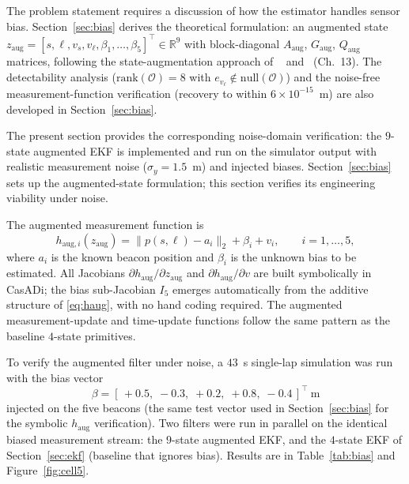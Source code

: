 \documentclass[11pt,a4paper]{article}
\begin{document}
The problem statement requires a discussion of how the estimator
handles sensor bias. Section~\ref{sec:bias} derives the theoretical
formulation: an augmented state
$z_\text{aug}=[s,\ell,v_s,v_\ell,\beta_1,\dots,\beta_5]^{\!\top}\in
\mathbb{R}^9$ with block-diagonal $A_\text{aug}$, $G_\text{aug}$,
$Q_\text{aug}$ matrices, following the state-augmentation approach of
~\cite{KalmanVI,Sopasakis_4_kalman_variants} and
\cite{Simon2006}~(Ch.~13). The detectability analysis
($\mathrm{rank}(\mathcal{O})=8$ with
$e_{v_\ell}\notin\mathrm{null}(\mathcal{O})$) and the noise-free
measurement-function verification (recovery to within
$6\times10^{-15}$~m) are also developed in Section~\ref{sec:bias}.

The present section provides the corresponding noise-domain
verification: the $9$-state augmented EKF is implemented and run on
the simulator output with realistic measurement noise
($\sigma_y=1.5$~m) and injected biases.
Section~\ref{sec:bias} sets up the augmented-state formulation;
this section verifies its engineering viability under noise.

The augmented measurement function is
\begin{equation}
h_{\text{aug},i}(z_\text{aug})
=\bigl\|p(s,\ell)-a_i\bigr\|_2+\beta_i+v_i,
\qquad i=1,\dots,5,
\label{eq:haug}
\end{equation}
where $a_i$ is the known beacon position and $\beta_i$ is
the unknown bias to be estimated. All Jacobians
$\partial h_\text{aug}/\partial z_\text{aug}$ and
$\partial h_\text{aug}/\partial v$ are built symbolically in CasADi;
the bias sub-Jacobian $I_5$ emerges automatically from the additive
structure of \eqref{eq:haug}, with no hand coding required. The
augmented measurement-update and time-update functions follow the
same pattern as the baseline $4$-state primitives.

To verify the augmented filter under noise, a $43$~s single-lap
simulation was run with the bias vector
\begin{equation*}
\beta = [\,+0.5,\;-0.3,\;+0.2,\;+0.8,\;-0.4\,]^{\!\top}~\mathrm{m}
\end{equation*}
injected on the five beacons (the same
test vector used in Section~\ref{sec:bias} for the symbolic
$h_\text{aug}$ verification). Two filters were run in parallel on the
identical biased measurement stream: the $9$-state augmented EKF, and
the $4$-state EKF of Section~\ref{sec:ekf} (baseline that ignores
bias). Results are in Table~\ref{tab:bias} and
Figure~\ref{fig:cell5}.
\end{document}
